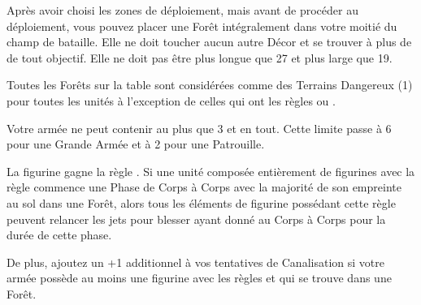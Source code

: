 \newcommand{\hawthornpointrule}{%
\feyarrows{}. \poisonedattacks{}.
}

\newcommand{\poisonedthornrule}{%
Arme de Tir. \range{12}, Force 3, \poisonedattacks{}, \armourpiercing{1}, \quicktofire{}.
}















\startarmywiderules

\armyspecialruleentry{\theforestfollows}

Après avoir choisi les zones de déploiement, mais avant de procéder au déploiement, vous pouvez placer une Forêt intégralement dans votre moitié du champ de bataille. Elle ne doit toucher aucun autre Décor et se trouver à plus de  de tout objectif. Elle ne doit pas être plus longue que \unit{27}{\centi\meter} et plus large que \unit{19}{\centi\meter}.

Toutes les Forêts sur la table sont considérées comme des Terrains Dangereux (1) pour toutes les unités à l'exception de celles qui ont les règles \strider{} ou \strider{\forest}. 

\armyspecialruleentry{\therarestofspirits}

Votre armée ne peut contenir au plus que 3 \treefathers{} et \treefatherancients{} en tout. Cette limite passe à 6 pour une Grande Armée et à 2 pour une Patrouille.

\closearmywiderules






\vspace*{1.5cm}
\startarmyspecialrules

\armyspecialruleentry{\forestwalker}

La figurine gagne la règle \strider{\forest}. Si une unité composée entièrement de figurines avec la règle \forestwalker{} commence une Phase de Corps à Corps avec la majorité de son empreinte au sol dans une Forêt, alors tous les éléments de figurine possédant cette règle peuvent relancer les jets pour blesser ayant donné  au Corps à Corps pour la durée de cette phase.

De plus, ajoutez un +1 additionnel à vos tentatives de Canalisation si votre armée possède au moins une figurine avec les règles \channel{} et \forestwalker{} qui se trouve dans une Forêt. 

